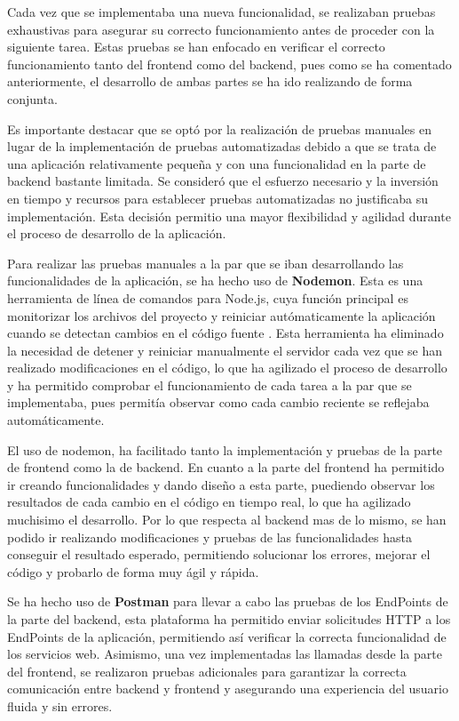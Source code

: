 \documentclass[12pt]{article}
\begin{document}
Cada vez que se implementaba una nueva funcionalidad, se realizaban pruebas exhaustivas para asegurar su correcto funcionamiento antes de proceder con la 
siguiente tarea. Estas pruebas se han enfocado en verificar el correcto funcionamiento tanto del frontend como del backend, pues como se ha comentado anteriormente, 
el desarrollo de ambas partes se ha ido realizando de forma conjunta.

Es importante destacar que se optó por la realización de pruebas manuales en lugar de la implementación de pruebas automatizadas debido a que se 
trata de una aplicación relativamente pequeña y con una funcionalidad en la parte de backend bastante limitada. Se consideró que el esfuerzo necesario y la inversión
en tiempo y recursos para establecer pruebas automatizadas no justificaba su implementación. Esta decisión permitio una mayor flexibilidad y agilidad durante
el proceso de desarrollo de la aplicación.

Para realizar las pruebas manuales a la par que se iban desarrollando las funcionalidades de la aplicación, se ha hecho uso de \textbf{Nodemon}. 
Esta es una herramienta de línea de comandos para Node.js, cuya función principal es monitorizar los archivos del proyecto y reiniciar autómaticamente
la aplicación cuando se detectan cambios en el código fuente \cite{nodemon}. 
Esta herramienta ha eliminado la necesidad de detener y reiniciar manualmente el servidor cada vez que se han realizado modificaciones en el código, 
lo que ha agilizado el proceso de desarrollo y ha permitido comprobar el funcionamiento de cada tarea a la par que se implementaba, pues permitía observar como
cada cambio reciente se reflejaba automáticamente.

El uso de nodemon, ha facilitado tanto la implementación y pruebas de la parte de frontend como la de backend. En cuanto a la parte del frontend
ha permitido ir creando funcionalidades y dando diseño a esta parte, puediendo observar los resultados de cada cambio en el código en tiempo real,
lo que ha agilizado muchisimo el desarrollo. Por lo que respecta al backend mas de lo mismo, se han podido ir realizando modificaciones y pruebas de las funcionalidades
hasta conseguir el resultado esperado, permitiendo solucionar los errores, mejorar el código y probarlo de forma muy ágil y rápida. 

Se ha hecho uso de \textbf{Postman} para llevar a cabo las pruebas de los EndPoints de la parte del backend, esta plataforma ha permitido enviar 
solicitudes HTTP a los EndPoints de la aplicación, permitiendo así verificar la correcta funcionalidad de los servicios web. Asimismo, una vez implementadas
las llamadas desde la parte del frontend, se realizaron pruebas adicionales para garantizar la correcta comunicación entre backend y frontend y asegurando una
experiencia del usuario fluida y sin errores.
\end{document}
